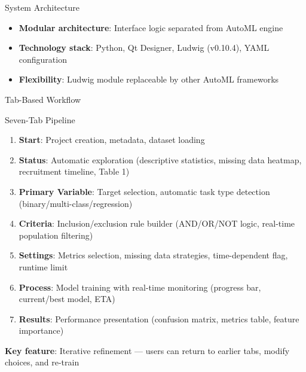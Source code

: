 \documentclass[aspectratio=169,10pt,english,dvipsnames]{beamer}
\begin{document}
\begin{frame}{System Architecture}
\begin{figure}[H]
{
        }
    \end{figure}
    
    \begin{itemize}
        \item \textbf{Modular architecture}: Interface logic separated from AutoML engine
        \item \textbf{Technology stack}: Python, Qt Designer, Ludwig (v0.10.4), YAML configuration
        \item \textbf{Flexibility}: Ludwig module replaceable by other AutoML frameworks
    \end{itemize}
\end{frame}

\begin{frame}{Tab-Based Workflow}
    \begin{block}{Seven-Tab Pipeline}
        \begin{enumerate}
            \item \textbf{Start}: Project creation, metadata, dataset loading
            \item \textbf{Status}: Automatic exploration (descriptive statistics, missing data heatmap, recruitment timeline, Table 1)
            \item \textbf{Primary Variable}: Target selection, automatic task type detection (binary/multi-class/regression)
            \item \textbf{Criteria}: Inclusion/exclusion rule builder (AND/OR/NOT logic, real-time population filtering)
            \item \textbf{Settings}: Metrics selection, missing data strategies, time-dependent flag, runtime limit
            \item \textbf{Process}: Model training with real-time monitoring (progress bar, current/best model, ETA)
            \item \textbf{Results}: Performance presentation (confusion matrix, metrics table, feature importance)
        \end{enumerate}
    \end{block}
    
    \textbf{Key feature}: Iterative refinement — users can return to earlier tabs, modify choices, and re-train
\end{frame}
\end{document}

